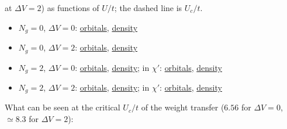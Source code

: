 \documentclass[11pt]{article}
\newcommand{\Ng}{N_{g}}
\newcommand{\dV}{\Delta V}
\begin{document}
at $\dV=2$) as functions of $U/t$; the dashed line is $U_c/t$.
\begin{itemize}[nosep]
  \item $\Ng=0$, $\dV=0$: \href{run:../scan_ng0/dV_0.0/qp_orbitals_vs_U.mp4}{orbitals}, \href{run:../scan_ng0/dV_0.0/qp_density_vs_U.mp4}{density}
  \item $\Ng=0$, $\dV=2$: \href{run:../scan_ng0/dV_2.0/qp_orbitals_vs_U.mp4}{orbitals}, \href{run:../scan_ng0/dV_2.0/qp_density_vs_U.mp4}{density}
  \item $\Ng=2$, $\dV=0$: \href{run:../scan_ng2_not_imp/qp_orbitals_vs_U.mp4}{orbitals}, \href{run:../scan_ng2_not_imp/qp_density_vs_U.mp4}{density}; in $\chi'$: \href{run:../scan_ng2_not_imp/qp_orbitals_vs_U_chip.mp4}{orbitals}, \href{run:../scan_ng2_not_imp/qp_density_vs_U_chip.mp4}{density}
  \item $\Ng=2$, $\dV=2$: \href{run:../scan_ng2_dV2_confirmed/qp_orbitals_vs_U.mp4}{orbitals}, \href{run:../scan_ng2_dV2_confirmed/qp_density_vs_U.mp4}{density}; in $\chi'$: \href{run:../scan_ng2_dV2_confirmed/qp_orbitals_vs_U_chip.mp4}{orbitals}, \href{run:../scan_ng2_dV2_confirmed/qp_density_vs_U_chip.mp4}{density}
\end{itemize}
What can be seen at the critical $U_c/t$ of the weight transfer ($6.56$ for $\dV=0$, $\simeq8.3$ for $\dV=2$):
\end{document}
